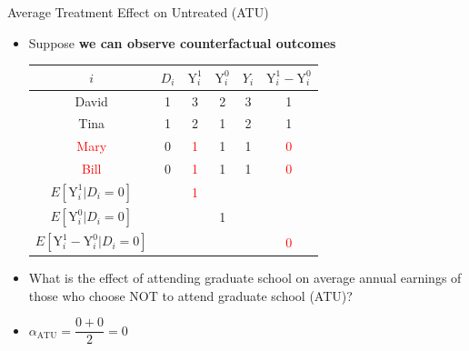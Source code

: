 \documentclass[hyperref={pdfpagelabels=false}]{beamer}
\begin{document}
\begin{frame}{Average Treatment Effect on Untreated (ATU)}
	\begin{itemize}
		\item Suppose \textbf{we can observe counterfactual outcomes}
		\vspace{0.2cm}
		\begin{center}
			\begin{threeparttable}
				\centering\footnotesize
				\begin{tabular}{cccccc}
					\toprule
					$i$ & $D_i$ & $\mathrm{Y}^{1}_{i}$ & $\mathrm{Y}^{0}_{i}$ & $Y_i$ & $\mathrm{Y}^{1}_{i}-\mathrm{Y}^{0}_{i}$  \\
					\midrule
					David & 1 & 3 & 2 & 3 & 1 \\
					Tina & 1 & 2 & 1 & 2 & 1 \\
				 \textcolor{red}{Mary} & 0 & \textcolor{red}1 & 1 & 1 & \textcolor{red}0 \\
				 \textcolor{red}{Bill} & 0 & \textcolor{red}1 & 1 & 1 & \textcolor{red}0 \\
					\midrule
					$E[\mathrm{Y}^{1}_{i}| D_i=0]$     & & \textcolor{red}1 &     &  &     \\
					$E[\mathrm{Y}^{0}_{i}| D_i=0]$     & &     & 1 &  &     \\
					\midrule
					$E[\mathrm{Y}^{1}_{i}-\mathrm{Y}^{0}_{i}| D_i=0]$ & &     &     &  & \textcolor{red}0 \\
					\bottomrule
				\end{tabular}
			\end{threeparttable}
		\end{center}
		
		\vspace{0.2cm}
		\item What is the effect of attending graduate school on average annual earnings of those who choose NOT to attend graduate school (ATU)?
		\vspace{0.2cm}
		\item $\alpha_{\text{ATU}}= \dfrac{0+0}{2} = 0$
	\end{itemize}
	
\end{frame}
\end{document}
